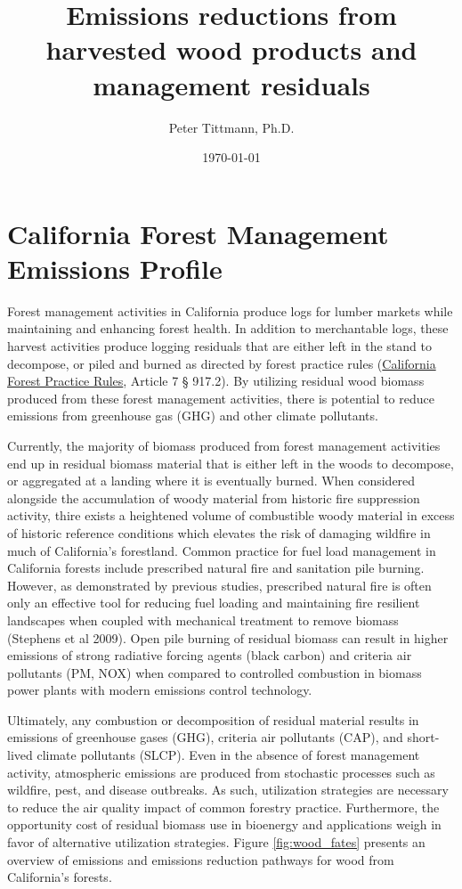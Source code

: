 \documentclass[a4paper]{article}
\author{Peter Tittmann, Ph.D.}
\date{\today}
\title{Emissions reductions from harvested wood products and management residuals}
\begin{document}
\maketitle
\tableofcontents

\pagebreak
\section{California Forest Management Emissions Profile}
\label{sec-1}

Forest management activities in California produce logs for lumber markets while maintaining and enhancing forest health. In addition to merchantable logs, these harvest activities produce logging residuals that are either left in the stand to decompose, or piled and burned as directed by forest practice rules (\href{http://calfire.ca.gov/resource_mgt/downloads/2013_FP_Rulebook_with_Tech_RuleNo1.pdf}{California Forest Practice Rules}, Article 7 §
917.2). By utilizing residual wood biomass produced from these forest management activities, there is potential to reduce emissions from greenhouse gas (GHG) and other climate pollutants.

Currently, the majority of biomass produced from forest management activities end up in residual biomass material that is either left in the woods to decompose, or aggregated at a landing where it is eventually burned. When considered alongside the accumulation of woody material from historic fire suppression activity, thire exists a heightened volume of combustible woody material in excess of historic reference conditions which elevates the risk of damaging wildfire in much of California’s forestland. Common practice for fuel load management in California forests include prescribed natural fire and sanitation pile burning. However, as demonstrated by previous studies, prescribed natural fire is often only an effective tool for reducing fuel loading and maintaining fire resilient landscapes when coupled with mechanical treatment to remove biomass (Stephens et al 2009). Open pile burning of residual biomass can result in higher emissions of strong radiative forcing agents (black carbon) and criteria air pollutants (PM, NOX) when compared to controlled combustion in biomass power plants with modern emissions control technology. 

Ultimately, any combustion or decomposition of residual material results in emissions of greenhouse gases (GHG), criteria air pollutants (CAP), and short-lived climate pollutants (SLCP). Even in the absence of forest management activity, atmospheric emissions are produced from 
stochastic processes such as wildfire, pest, and disease outbreaks. As such, utilization strategies are necessary to reduce the air quality impact of common forestry practice. Furthermore, the opportunity cost of residual biomass use in bioenergy and applications weigh in favor of alternative utilization strategies. Figure \ref{fig:wood_fates} presents an overview of emissions and emissions reduction pathways for wood from California's forests. 
\end{document}
